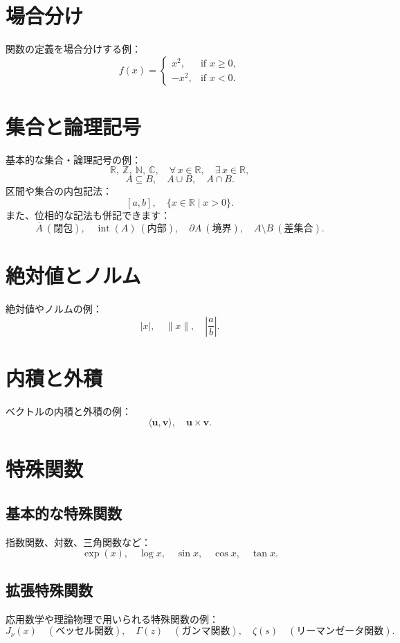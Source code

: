 \documentclass{ltjsarticle} %
\begin{document}
\section{場合分け}
関数の定義を場合分けする例：
\[
  f(x)=
  \begin{cases}
    x^2, & \text{if } x \ge 0,\\[1mm]
    -x^2, & \text{if } x < 0.
  \end{cases}
\]

\section{集合と論理記号}
基本的な集合・論理記号の例：
\[
  \mathbb{R},\ \mathbb{Z},\ \mathbb{N},\ \mathbb{C}, \quad \forall\, x \in \mathbb{R}, \quad \exists\, x \in \mathbb{R},
\]
\[
  A \subseteq B,\quad A \cup B,\quad A \cap B.
\]
区間や集合の内包記法：
\[
  [a,b],\quad \{ x \in \mathbb{R} \mid x > 0 \}.
\]
また、位相的な記法も併記できます：
\[
  \overline{A} \ (\text{閉包}),\quad \operatorname{int}(A) \ (\text{内部}),\quad \partial A \ (\text{境界}),\quad A \setminus B \ (\text{差集合}).
\]

\section{絶対値とノルム}
絶対値やノルムの例：
\[
  |x|, \quad \|x\|, \quad \left| \frac{a}{b} \right|.
\]

\section{内積と外積}
ベクトルの内積と外積の例：
\[
  \langle \mathbf{u}, \mathbf{v} \rangle, \quad \mathbf{u} \times \mathbf{v}.
\]

\section{特殊関数}
\subsection{基本的な特殊関数}
指数関数、対数、三角関数など：
\[
  \exp(x),\quad \log x,\quad \sin x,\quad \cos x,\quad \tan x.
\]
\subsection{拡張特殊関数}
応用数学や理論物理で用いられる特殊関数の例：
\[
  J_\nu(x) \quad (\text{ベッセル関数}),\quad \Gamma(z) \quad (\text{ガンマ関数}),\quad \zeta(s) \quad (\text{リーマンゼータ関数}).
\]
\end{document}
